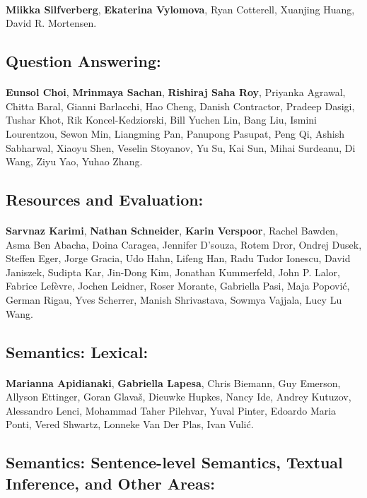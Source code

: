 \paragraph{}\textbf{Miikka Silfverberg}, \textbf{Ekaterina Vylomova}, Ryan Cotterell, Xuanjing Huang, David R. Mortensen.
\subsection*{Question Answering:}
\paragraph{}\textbf{Eunsol Choi}, \textbf{Mrinmaya Sachan}, \textbf{Rishiraj Saha Roy}, Priyanka Agrawal, Chitta Baral, Gianni Barlacchi, Hao Cheng, Danish Contractor, Pradeep Dasigi, Tushar Khot, Rik Koncel-Kedziorski, Bill Yuchen Lin, Bang Liu, Ismini Lourentzou, Sewon Min, Liangming Pan, Panupong Pasupat, Peng Qi, Ashish Sabharwal, Xiaoyu Shen, Veselin Stoyanov, Yu Su, Kai Sun, Mihai Surdeanu, Di Wang, Ziyu Yao, Yuhao Zhang.
\subsection*{Resources and Evaluation:}
\paragraph{}\textbf{Sarvnaz Karimi}, \textbf{Nathan Schneider}, \textbf{Karin Verspoor}, Rachel Bawden, Asma Ben Abacha, Doina Caragea, Jennifer D'souza, Rotem Dror, Ondrej Dusek, Steffen Eger, Jorge Gracia, Udo Hahn, Lifeng Han, Radu Tudor Ionescu, David Janiszek, Sudipta Kar, Jin-Dong Kim, Jonathan Kummerfeld, John P. Lalor, Fabrice Lefèvre, Jochen Leidner, Roser Morante, Gabriella Pasi, Maja Popović, German Rigau, Yves Scherrer, Manish Shrivastava, Sowmya Vajjala, Lucy Lu Wang.
\subsection*{Semantics: Lexical:}
\paragraph{}\textbf{Marianna Apidianaki}, \textbf{Gabriella Lapesa}, Chris Biemann, Guy Emerson, Allyson Ettinger, Goran Glavaš, Dieuwke Hupkes, Nancy Ide, Andrey Kutuzov, Alessandro Lenci, Mohammad Taher Pilehvar, Yuval Pinter, Edoardo Maria Ponti, Vered Shwartz, Lonneke Van Der Plas, Ivan Vulić.
\subsection*{Semantics: Sentence-level Semantics, Textual Inference, and Other Areas:}
